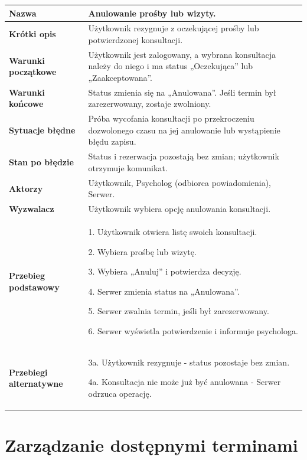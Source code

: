 \documentclass[11pt,a4paper]{article}
\renewcommand{\arraystretch}{1.3}
\newcommand{\pole}[2]{
\textbf{#1} & #2 \\ \hline
}
\begin{document}
\begingroup
\small
\renewcommand{\arraystretch}{1.14}

\begin{tabularx}{\textwidth}{|p{3.9cm}|Y|}
\hline

\pole{Nazwa}{
Anulowanie prośby lub wizyty.
}

\pole{Krótki opis}{
Użytkownik rezygnuje z oczekującej
prośby lub potwierdzonej konsultacji.
}

\pole{Warunki początkowe}{
Użytkownik jest zalogowany,
a wybrana konsultacja należy do niego
i ma status „Oczekująca” lub „Zaakceptowana”.
}

\pole{Warunki końcowe}{
Status zmienia się na „Anulowana”.
Jeśli termin był zarezerwowany,
zostaje zwolniony.
}

\pole{Sytuacje błędne}{
Próba wycofania konsultacji po przekroczeniu dozwolonego czasu na jej anulowanie lub wystąpienie błędu zapisu.
}

\pole{Stan po błędzie}{
Status i rezerwacja pozostają bez zmian;
użytkownik otrzymuje komunikat.
}

\pole{Aktorzy}{
Użytkownik,
Psycholog (odbiorca powiadomienia),
Serwer.
}

\pole{Wyzwalacz}{
Użytkownik wybiera opcję
anulowania konsultacji.
}

\pole{Przebieg podstawowy}{
1. Użytkownik otwiera listę swoich konsultacji.\par
2. Wybiera prośbę lub wizytę.\par
3. Wybiera „Anuluj” i potwierdza decyzję.\par
4. Serwer zmienia status na „Anulowana”.\par
5. Serwer zwalnia termin,
jeśli był zarezerwowany.\par
6. Serwer wyświetla potwierdzenie i informuje psychologa.
}

\pole{Przebiegi alternatywne}{
3a. Użytkownik rezygnuje -
status pozostaje bez zmian.\par
4a. Konsultacja nie może już być anulowana -
Serwer odrzuca operację.
}

\end{tabularx}
\endgroup

\clearpage

\section*{Zarządzanie dostępnymi terminami}

\begingroup
\small
\renewcommand{\arraystretch}{1.14}
\end{document}
